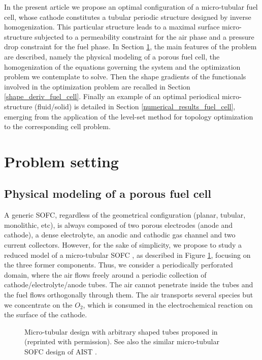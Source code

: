 \documentclass{article}
\begin{document}
In the present article we propose an optimal configuration of a micro-tubular fuel cell, whose cathode constitutes a tubular periodic structure designed by inverse homogenization. This particular structure leads to a maximal surface micro-structure subjected to a permeability constraint for the air phase and a pressure drop constraint for the fuel phase. In Section \ref{fuel_cell_setting_problem}, the main features of the problem are described, namely the physical modeling of a porous fuel cell, the homogenization of the equations governing the system and the optimization problem we contemplate to solve. Then the shape gradients of the functionals involved in the optimization problem are recalled in Section \ref{shape_deriv_fuel_cell}. Finally an example of an optimal periodical micro-structure (fluid/solid) is detailed in Section \ref{numerical_results_fuel_cell}, emerging from the application of the level-set method for topology optimization to the corresponding cell problem.




\section{Problem setting}
\label{fuel_cell_setting_problem}
\subsection{Physical modeling of a porous fuel cell}

A generic SOFC, regardless of the geometrical configuration (planar, tubular, monolithic, etc), is always composed of two porous electrodes (anode and cathode), a dense electrolyte, an anodic and cathodic gas channel and two current collectors. However, for the sake of simplicity, we propose to study a reduced model of a micro-tubular SOFC \cite{de2011production}, as described in {Figure \ref{tubular_fuel_cell}}, focusing on the three former components. Thus, we consider a periodically perforated domain, 
where the air flows freely around a periodic collection of cathode/electrolyte/anode tubes. The air cannot penetrate inside the tubes and the fuel flows orthogonally through them.
The air transports several species but we concentrate on the $O_2$, which is consumed in the electrochemical reaction on the surface of the cathode.
 

\begin{figure}[h]
\begin{center}
\end{center}
\caption{Micro-tubular design with arbitrary shaped tubes proposed in \cite{etienne} (reprinted with permission). See also the similar micro-tubular SOFC design of AIST \cite{national_institute}.}\label{tubular_fuel_cell}
\end{figure}
\end{document}
